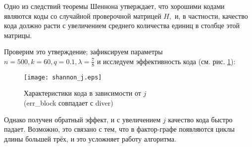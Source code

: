 \documentclass[12pt,a4paper,oneside,fleqn,leqno]{article}
\begin{document}
\begin{enumerate}
			Одно из следствий теоремы Шеннона утверждает, что хорошими кодами являются коды со случайной проверочной матрицей $H,$ и, в частности, качество кода должно расти с увеличением среднего количества единиц в столбце этой матрицы.\par
			Проверим это утверждение; зафиксируем параметры $n =500, k = 60, q = 0.1, \lambda = \frac{7}{8}$ и исследуем эффективность кода (см. рис. \ref{fig:shannon_j}):
			\begin{figure}[H]
				\centering
				\captionsetup{justification=centering}
				\texttt{[image: shannon\_j.eps]}
				\caption{Характеристики кода в зависимости от $j$\\ (err\_block совпадает с diver)}
				\label{fig:shannon_j}
			\end{figure}\par
			Однако получен обратный эффект, и с увеличением $j$ качество кода быстро падает. Возможно, это связано с тем, что в фактор-графе появляются циклы длины большей трёх, и это усложняет работу алгоритма.
		\end{enumerate}
\end{document}

